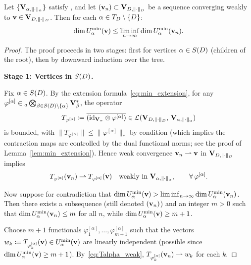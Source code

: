 \begin{theorem}
\label{thm:TBT_rank_lsc}
Let $\{\mathbf{V}_{\alpha,\|\cdot\|_\alpha}\}$ satisfy \condINJ[$T_D$], and let
$(\mathbf{v}_n) \subset \mathbf{V}_{D,\|\cdot\|_D}$ be a sequence converging weakly to
$\mathbf{v} \in \mathbf{V}_{D,\|\cdot\|_D}$. Then for each $\alpha \in T_D \setminus \{D\}$:
\begin{equation}
\label{eq:rank_lsc}
    \dim U^{\min}_{\alpha}(\mathbf{v}) \leq
    \liminf_{n \to \infty} \dim U^{\min}_{\alpha}(\mathbf{v}_n).
\end{equation}
\end{theorem}

\begin{proof}
The proof proceeds in two stages: first for vertices $\alpha \in S(D)$
(children of the root), then by downward induction over the tree.

\medskip
\noindent\textbf{Stage 1: Vertices in $S(D)$.}

Fix $\alpha \in S(D)$. By the extension formula~\eqref{eq:min_extension},
for any $\varphi^{[\alpha]} \in {}_a\bigotimes_{\beta \in S(D)
\setminus \{\alpha\}} \mathbf{V}_\beta^*$, the operator
\begin{equation*}
    T_{\varphi^{[\alpha]}}
    \coloneqq \overline{(\mathrm{id}_{\mathbf{V}_\alpha} \otimes \varphi^{[\alpha]})}
    \in \mathcal{L}(\mathbf{V}_{D,\|\cdot\|_D},\, \mathbf{V}_{\alpha,\|\cdot\|_\alpha})
\end{equation*}
is bounded, with $\|T_{\varphi^{[\alpha]}}\| \leq
\|\varphi^{[\alpha]}\|_*$ by condition \condINJ[$T_D$]
(which implies the contraction maps are controlled by the dual
functional norms; see the proof of Lemma~\ref{lem:min_extension}).
Hence weak convergence $\mathbf{v}_n \rightharpoonup \mathbf{v}$ in $\mathbf{V}_{D,\|\cdot\|_D}$
implies
\begin{equation}
\label{eq:Talpha_weak}
    T_{\varphi^{[\alpha]}}(\mathbf{v}_n)
    \rightharpoonup T_{\varphi^{[\alpha]}}(\mathbf{v})
    \quad \text{weakly in } \mathbf{V}_{\alpha,\|\cdot\|_\alpha},
    \qquad \forall\, \varphi^{[\alpha]}.
\end{equation}

Now suppose for contradiction that
$\dim U^{\min}_{\alpha}(\mathbf{v}) > \liminf_{n \to \infty} \dim U^{\min}_{\alpha}(\mathbf{v}_n)$.
Then there exists a subsequence (still denoted $(\mathbf{v}_n)$) and an integer
$m > 0$ such that $\dim U^{\min}_{\alpha}(\mathbf{v}_n) \leq m$ for all $n$,
while $\dim U^{\min}_{\alpha}(\mathbf{v}) \geq m+1$.

Choose $m+1$ functionals $\varphi^{[\alpha]}_1, \ldots,
\varphi^{[\alpha]}_{m+1}$ such that the vectors
$w_k \coloneqq T_{\varphi^{[\alpha]}_k}(\mathbf{v}) \in U^{\min}_{\alpha}(\mathbf{v})$
are linearly independent (possible since $\dim U^{\min}_{\alpha}(\mathbf{v})
\geq m+1$). By~\eqref{eq:Talpha_weak},
$T_{\varphi^{[\alpha]}_k}(\mathbf{v}_n) \rightharpoonup w_k$ for each $k$.


\end{proof}

